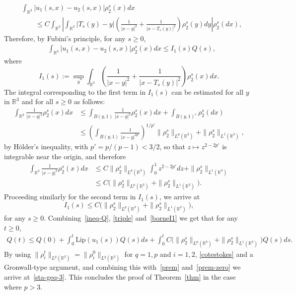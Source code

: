 \documentclass[10pt]{amsart}
\theoremstyle{definition}\newtheorem{defi}[theo]{Definition}\newtheorem{rema}[theo]{Remark}\newtheorem{exam}[theo]{Example}\newtheorem{exem}[theo]{Example}\newtheorem{nota}[theo]{Notation}
\newcommand{\Lip}{\mathrm{Lip}}
\newcommand{\R}{\mathbb{R}}
\renewcommand{\leq}{\leqslant}
\renewcommand{\geq}{\geqslant}
\begin{document}
\begin{align*}
&\int_{\R^3} |u_1(s,x)-u_2(s,x)| \rho^s_2(x)dx
\\ &\quad \quad \leq C \int_{\R^3} \left| \int_{\R^3}|T_s (y)-y| \left(\frac{1}{|x-y|^2}+ \frac{1}{|x-T_s (y)|^2} \right) \rho_2^s(y)dy \right| \rho_2^s(dx),
\end{align*}
Therefore, by Fubini's principle, for any $s\geq 0$,
\begin{align}\label{triple}
& \int_{\R^3} |u_1(s,x)-u_2(s,x)| \rho_2^s(x)dx \leq I_1 (s) Q(s),
\end{align}
where
\begin{equation*}
I_1 (s):= \sup_y \int_{\R^3} \left(\frac{1}{|x-y|^2}+ \frac{1}{|x-T_s (y)|^2} \right) \rho_2^s (x)dx.
\end{equation*}
The integral corresponding to the first term in $I_1 (s)$ can be estimated for all $y$ in $\R^3$ and for all $s\geq 0$ as follows:
\begin{align*}
\int_{\R^3} \frac{1}{|x-y|^2}\rho_2^s(x)dx &\leq \int_{B(y,1)}\frac{1}{|x-y|^2} \rho_2^s(x) dx + \int_{B(y,1)^c} \rho_2^s(dx) \\
& \leq \left(\int_{B(y,1)} \frac{1}{|x-y|^{2p'}}\right)^{1/p'} \| \rho_2^s\|_{L^p\left(\R^3\right)} + \|\rho_2^s\|_{L^1\left(\R^3\right)},
\end{align*}
by H\"older's inequality, with $p'= p/(p-1)<3/2$, so that $z\mapsto z^{2-2p'}$ is integrable near the origin, and therefore
\begin{align*}
\int_{\R^3} \frac{1}{|x-y|^2}\rho_2^s(x)dx
&\leq C\| \rho_2^s\|_{L^p\left(\R^3\right)} \int_0^1 z^{2-2p'} dz + \|\rho_2^s\|_{L^1\left(\R^3\right)} \\ &\leq C\big(\| \rho_2^s\|_{L^p\left(\R^3\right)}+ \|\rho_2^s\|_{L^1\left(\R^3\right)}\big).
\end{align*}
Proceeding similarly for the second term in $I_1 (s)$, we arrive at
\begin{equation}\label{borneI1}
I_1 (s) \leq C \big(\| \rho_2^s\|_{L^p\left(\R^3\right)}+ \|\rho_2^s\|_{L^1\left(\R^3\right)}\big),
\end{equation}
for any $s\geq 0$. Combining~\eqref{ineq-Q}, \eqref{triple} and~\eqref{borneI1} we get that for any $t\geq 0$,
\begin{align*}
Q(t) \leq Q(0) + \int_0^t \Lip(u_1(s)) Q(s) ds+ \int_0^t C \big(\| \rho_2^s\|_{L^p\left(\R^3\right)}+ \|\rho_2^s\|_{L^1\left(\R^3\right)}\big)Q(s) ds.
\end{align*}
By using $\|\rho_i^t\|_{L^q(\R^3)}=\|\rho_i^0\|_{L^q(\R^3)}$ for $q=1,p$ and $i=1,2$, \eqref{cotestokes} and a Gronwall-type argument, and combining this with~\eqref{prem} and~\eqref{prem-zero} we arrive at~\eqref{sta-geq-3}. This concludes the proof of Theorem~\ref{thm} in the case where $p> 3$.
\end{document}
